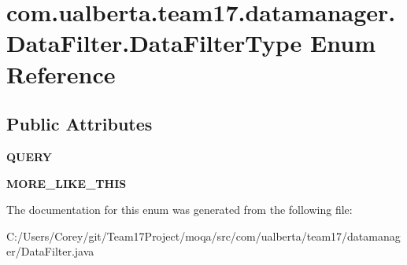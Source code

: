 \hypertarget{enumcom_1_1ualberta_1_1team17_1_1datamanager_1_1_data_filter_1_1_data_filter_type}{\section{com.\+ualberta.\+team17.\+datamanager.\+Data\+Filter.\+Data\+Filter\+Type Enum Reference}
\label{enumcom_1_1ualberta_1_1team17_1_1datamanager_1_1_data_filter_1_1_data_filter_type}
}
\subsection*{Public Attributes}
\begin{DoxyCompactItemize}
\item 
\hypertarget{enumcom_1_1ualberta_1_1team17_1_1datamanager_1_1_data_filter_1_1_data_filter_type_acd5691f17e93214f2f44faad97032450}{{\bfseries Q\+U\+E\+R\+Y}}\label{enumcom_1_1ualberta_1_1team17_1_1datamanager_1_1_data_filter_1_1_data_filter_type_acd5691f17e93214f2f44faad97032450}

\item 
\hypertarget{enumcom_1_1ualberta_1_1team17_1_1datamanager_1_1_data_filter_1_1_data_filter_type_ac305090e85ae454e579c41168550ba71}{{\bfseries M\+O\+R\+E\+\_\+\+L\+I\+K\+E\+\_\+\+T\+H\+I\+S}}\label{enumcom_1_1ualberta_1_1team17_1_1datamanager_1_1_data_filter_1_1_data_filter_type_ac305090e85ae454e579c41168550ba71}

\end{DoxyCompactItemize}


The documentation for this enum was generated from the following file\+:\begin{DoxyCompactItemize}
\item 
C\+:/\+Users/\+Corey/git/\+Team17\+Project/moqa/src/com/ualberta/team17/datamanager/Data\+Filter.\+java\end{DoxyCompactItemize}
